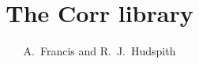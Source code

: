 \documentclass[12pt,prd,aps,nofootinbib,floatfix]{revtex4-1}
\begin{document}
\title{The Corr library}

\author{A.~Francis and R.~J.~Hudspith}

\maketitle













{}

\end{document}
